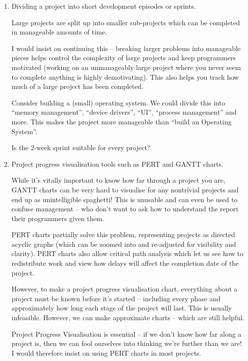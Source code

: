 \documentclass[10pt,\jkfside,a4paper]{article}
\begin{document}
\begin{enumerate}
\begin{enumerate}

\item Dividing a project into short development episodes or sprints.

Large projects are split up into smaller sub-projects which can be
completed in manageable amounts of time.

I would insist on continuing this -- breaking larger problems into manageable
pieces helps control the complexity of large projects and keep programmers
motivated (working on an unmanageably large project where you never seem to
complete anything is highly demotivating). This also helps you track how much
of a large project has been completed.

Consider building a (small) operating system. We could divide this into
``memory management'', ``device drivers'', ``UI'', ``process management''
and more. This makes the project more manageable than ``build an Operating
System''.

{\color{blue}
Is the 2-week sprint suitable for every project?
}

\item Project progress visualisation tools such as PERT and GANTT charts.

While it's vitally important to know how far through a project you are,
GANTT charts can be very hard to visualise for any nontrivial projects
and end up as unintelligible spaghetti! This is unusable and can even
be used to confuse management -- who don't want to ask how to understand
the report their programmers given them.

PERT charts partially solve this problem, representing projects as directed
acyclic graphs (which can be zoomed into and re-adjusted for visibility and
clarity). PERT charts also allow critical path analysis which let us see how
to redistribute work and view how delays will affect the completion date of
the project.

However, to make a project progress visualisation chart, everything about a
project must be known before it's started -- including every phase and
approximately how long each stage of the project will last. This is usually
infeasible. However, we can make approximate charts -- which are still helpful.

Project Progress Visualisation is essential -- if we don't know how far along
a project is, then we can fool ourselves into thinking we're further than we
are! I would therefore insist on using PERT charts in most projects.


\end{enumerate}
\end{enumerate}
\end{document}
